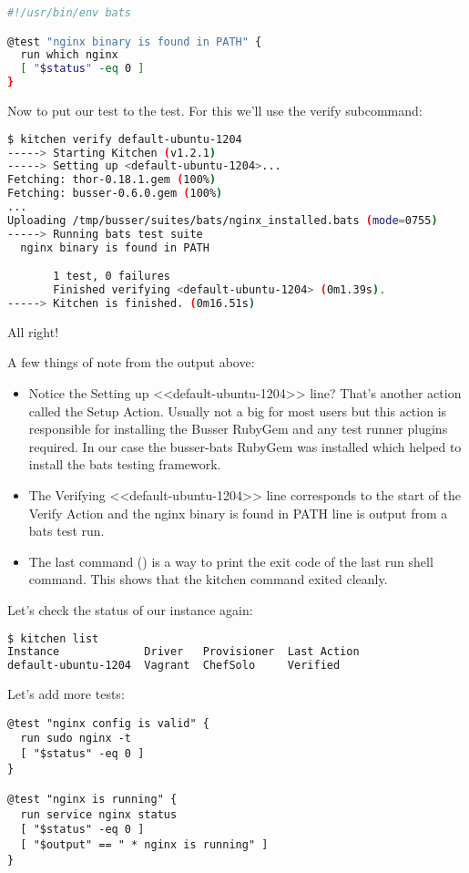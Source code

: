 \begin{lstlisting}[language=Bash,label=lst:testing-test-kitchen14]
#!/usr/bin/env bats

@test "nginx binary is found in PATH" {
  run which nginx
  [ "$status" -eq 0 ]
}
\end{lstlisting}

Now to put our test to the test. For this we'll use the verify subcommand:

\begin{lstlisting}[language=Bash,label=lst:testing-test-kitchen15]
$ kitchen verify default-ubuntu-1204
-----> Starting Kitchen (v1.2.1)
-----> Setting up <default-ubuntu-1204>...
Fetching: thor-0.18.1.gem (100%)
Fetching: busser-0.6.0.gem (100%)
...
Uploading /tmp/busser/suites/bats/nginx_installed.bats (mode=0755)
-----> Running bats test suite
  nginx binary is found in PATH

       1 test, 0 failures
       Finished verifying <default-ubuntu-1204> (0m1.39s).
-----> Kitchen is finished. (0m16.51s)
\end{lstlisting}

All right!

A few things of note from the output above:

\begin{itemize}
  \item Notice the Setting up <<default-ubuntu-1204>> line? That's another action called the Setup Action. Usually not a big for most users but this action is responsible for installing the Busser RubyGem and any test runner plugins required. In our case the busser-bats RubyGem was installed which helped to install the bats testing framework.
  \item The Verifying <<default-ubuntu-1204>> line corresponds to the start of the Verify Action and the nginx binary is found in PATH line is output from a bats test run.
  \item The last command () is a way to print the exit code of the last run shell command. This shows that the kitchen command exited cleanly.
\end{itemize}

Let's check the status of our instance again:

\begin{lstlisting}[language=Bash,label=lst:testing-test-kitchen16]
$ kitchen list
Instance             Driver   Provisioner  Last Action
default-ubuntu-1204  Vagrant  ChefSolo     Verified
\end{lstlisting}

Let's add more tests:

\begin{lstlisting}[label=lst:testing-test-kitchen17]
@test "nginx config is valid" {
  run sudo nginx -t
  [ "$status" -eq 0 ]
}

@test "nginx is running" {
  run service nginx status
  [ "$status" -eq 0 ]
  [ "$output" == " * nginx is running" ]
}
\end{lstlisting}
